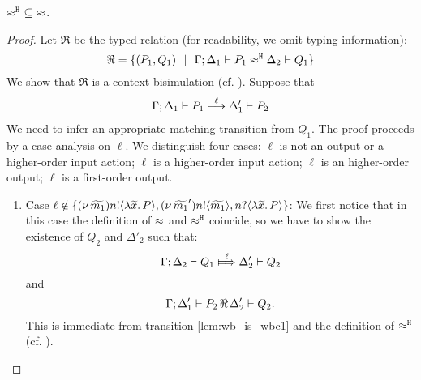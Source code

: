 
\begin{lemma}
	\label{app:lem:wb_is_wbc}
	$\approx^\mathtt{H}\ \subseteq\ \approx$.
\end{lemma}

\begin{proof}
	Let $\Re$ be the typed relation (for readability, we omit typing information):
	\[
		\Re = \{(P_1, Q_1) \ \ |\ \  \Gamma; \Delta_1 \vdash P_1 \approx^\mathtt{H} \Delta_2 \vdash Q_1\}
	\]
	We show that $\Re$ is a context bisimulation (cf. ). Suppose that
		\begin{eqnarray}
		\Gamma; \Delta_1 \vdash P_1 \stackrel{\ell}{\longmapsto} \Delta_1' \vdash P_2
		\label{lem:wb_is_wbc1}
	\end{eqnarray}
	We need to infer an appropriate matching transition from $Q_1$.
	The proof proceeds by a case analysis on  $\ell$.
	We distinguish four cases: $\ell$ is not an output or a higher-order input action;
	$\ell$ is a higher-order input action;
	$\ell$ is an higher-order output; $\ell$ is a first-order output.
	\begin{enumerate}[1.]
		\item Case $\ell \notin \{ (\nu\, \widetilde{m_1}) n ! \langle \lambda \widetilde{x}.\,P \rangle,  (\nu\, \widetilde{m_1}') n ! \langle \widetilde{m_1} \rangle, n ? \langle \lambda \widetilde{x}.\,P \rangle \}$: 
		We first notice that in this case the definition of $\approx$ and $\approx^\mathtt{H}$ coincide, so 
		we have to show the existence of 
		$Q_2$ and $\Delta'_2$ such that:	
				\[
					\horel{\Gamma}{\Delta_2}{Q_1}{\Hby{\ell}}{\Delta_2'}{Q_2}
				\]
				\noi and
				\[
					\Gamma; \Delta_1' \vdash P_2 \,\Re\, \Delta_2' \vdash Q_2.
				\]
		This is immediate from 
		transition \eqref{lem:wb_is_wbc1} 
		and the definition of $\approx^\mathtt{H}$ (cf. ). %


\end{enumerate}
\end{proof}
